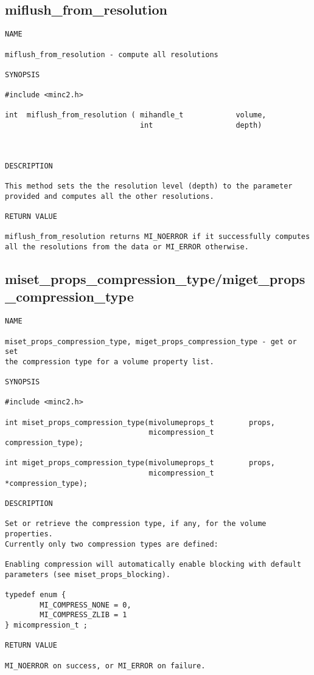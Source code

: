 \documentclass{article}
\begin{document}
\subsection{miflush\_from\_resolution}
\begin{verbatim}
NAME 

miflush_from_resolution - compute all resolutions

SYNOPSIS

#include <minc2.h>

int  miflush_from_resolution ( mihandle_t            volume,
                               int                   depth)
                                   
                       
                                
DESCRIPTION

This method sets the the resolution level (depth) to the parameter
provided and computes all the other resolutions.

RETURN VALUE

miflush_from_resolution returns MI_NOERROR if it successfully computes 
all the resolutions from the data or MI_ERROR otherwise.
\end{verbatim}

\subsection{miset\_props\_compression\_type/miget\_props\_compression\_type}
\begin{verbatim}
NAME

miset_props_compression_type, miget_props_compression_type - get or set
the compression type for a volume property list.

SYNOPSIS

#include <minc2.h>

int miset_props_compression_type(mivolumeprops_t        props, 
                                 micompression_t        compression_type);

int miget_props_compression_type(mivolumeprops_t        props,
                                 micompression_t        *compression_type);

DESCRIPTION

Set or retrieve the compression type, if any, for the volume properties.
Currently only two compression types are defined:

Enabling compression will automatically enable blocking with default
parameters (see miset_props_blocking).

typedef enum {
        MI_COMPRESS_NONE = 0,
        MI_COMPRESS_ZLIB = 1
} micompression_t ;

RETURN VALUE

MI_NOERROR on success, or MI_ERROR on failure.
\end{verbatim}
\end{document}
